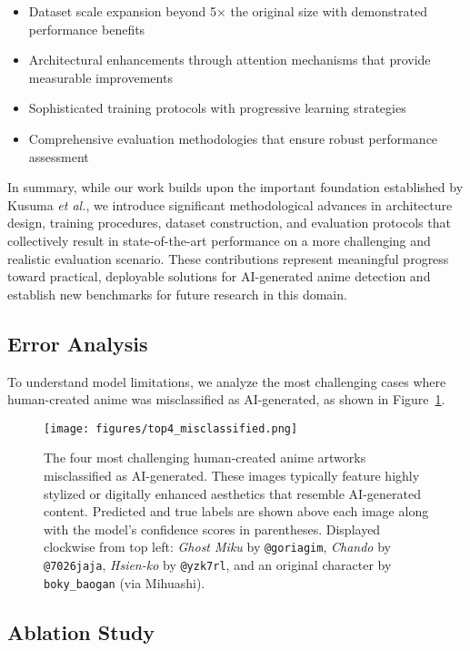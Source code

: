 \documentclass{article}
\begin{document}
\begin{itemize}
    \item Dataset scale expansion beyond 5× the original size with demonstrated performance benefits
    \item Architectural enhancements through attention mechanisms that provide measurable improvements
    \item Sophisticated training protocols with progressive learning strategies
    \item Comprehensive evaluation methodologies that ensure robust performance assessment
\end{itemize}

In summary, while our work builds upon the important foundation established by Kusuma \textit{et al.}, we introduce significant methodological advances in architecture design, training procedures, dataset construction, and evaluation protocols that collectively result in state-of-the-art performance on a more challenging and realistic evaluation scenario. These contributions represent meaningful progress toward practical, deployable solutions for AI-generated anime detection and establish new benchmarks for future research in this domain.


\subsection{Error Analysis}

To understand model limitations, we analyze the most challenging cases where human-created anime was misclassified as AI-generated, as shown in Figure~\ref{fig:misclassified_examples}.

\begin{figure}[H]
\centering
\texttt{[image: figures/top4\_misclassified.png]}
\caption{The four most challenging human-created anime artworks misclassified as AI-generated. These images typically feature highly stylized or digitally enhanced aesthetics that resemble AI-generated content. Predicted and true labels are shown above each image along with the model's confidence scores in parentheses. Displayed clockwise from top left: \textit{Ghost Miku} by \texttt{@goriagim}, \textit{Chando} by \texttt{@7026jaja}, \textit{Hsien-ko} by \texttt{@yzk7rl}, and an original character by \texttt{boky\_baogan} (via Mihuashi).}
\label{fig:misclassified_examples}
\end{figure}

\subsection{Ablation Study}
\end{document}
